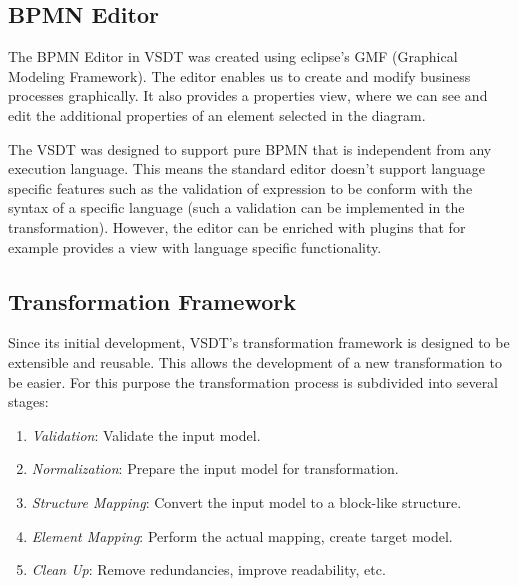 \subsection{BPMN Editor}
The BPMN Editor in VSDT was created using eclipse's GMF (Graphical Modeling Framework). The editor enables us to create and modify business processes graphically. It also provides a properties view, where we can see and edit the additional properties of an element selected in the diagram. 

The VSDT was designed to support pure BPMN that is independent from any execution language\cite{TKAH08}. This means the standard editor doesn't support language specific features such as the validation of expression to be conform with the syntax of a specific language (such a validation can be implemented in the transformation). However, the editor can be enriched with plugins that for example provides a view with language specific functionality.  


\subsection{Transformation Framework}
Since its initial development, VSDT's transformation framework is designed to be extensible and reusable. This allows the development of a new transformation to be easier. For this purpose the transformation process is subdivided into several stages: 
\begin{enumerate}
	\item \textit{Validation}: Validate the input model.
	\item \textit{Normalization}: Prepare the input model for transformation.
	\item \textit{Structure Mapping}: Convert the input model to a block-like structure.
	\item \textit{Element Mapping}: Perform the actual mapping, create target model.
	\item \textit{Clean Up}: Remove redundancies, improve readability, etc.
\end{enumerate}

